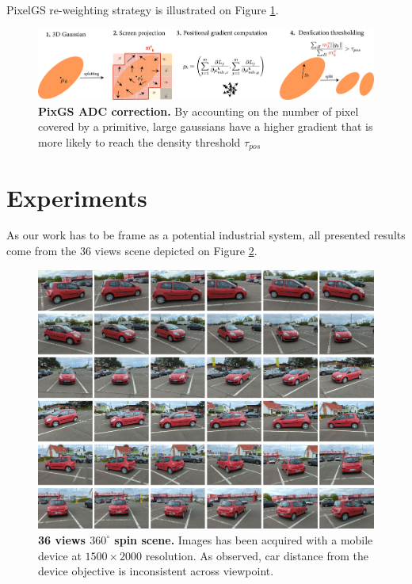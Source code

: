 PixelGS re-weighting strategy is illustrated on Figure \ref{fig:pixgs-adc}. 



\begin{figure}[htbp!]
    \center
  \includegraphics[width=\linewidth]{images/gaussiansplatting/pixgs_implem_improvement.png}
  \caption{\textbf{PixGS ADC correction.} By accounting on the number of pixel covered by a primitive, large gaussians have a higher gradient that is more likely to reach the density threshold $\tau_{pos}$}
  \label{fig:pixgs-adc}
\end{figure}



\section{Experiments}
\label{sec:exp}

As our work has to be frame as a potential industrial system, all presented results come from the 36 views scene depicted on Figure \ref{fig:all_views}. 
\begin{figure}[htpb!]
  \center
\includegraphics[width=.9\linewidth]{images/gaussiansplatting/original_scene.png}
\caption{\textbf{36 views $360^{\circ}$ spin scene.} Images has been acquired with a mobile device at $1500\times 2000$ resolution. As observed, car distance from the device objective is inconsistent across viewpoint.}
\label{fig:all_views}
\end{figure}

